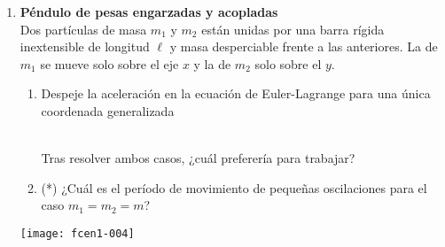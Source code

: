 \documentclass[11pt, spanish, a4paper, twoside]{article}
\begin{document}
\begin{enumerate}
\item 
\begin{minipage}[t][5.5cm]{0.7\textwidth}
	\textbf{Péndulo de pesas engarzadas y acopladas}\\ 
	Dos partículas de masa \(m_1\) y \(m_2\) están unidas por una barra rígida inextensible de longitud \(\ell\) y masa desperciable frente a las anteriores.
	La de \(m_1\) se mueve solo sobre el eje \(x\) y la de \(m_2\) solo sobre el \(y\).
\begin{enumerate}
	\item Despeje la aceleración en la ecuación de Euler-Lagrange para una única coordenada generalizada\\
	\\ %
	Tras resolver ambos casos, ¿cuál preferería para trabajar?
	\item (*) ¿Cuál es el período de movimiento de pequeñas oscilaciones para el caso \(m_1 = m_2 = m\)?
\end{enumerate}
\end{minipage}
\begin{minipage}[c][0cm][t]{0.3\textwidth}
	\texttt{[image: fcen1-004]}
\end{minipage}




\end{enumerate}
\end{document}

